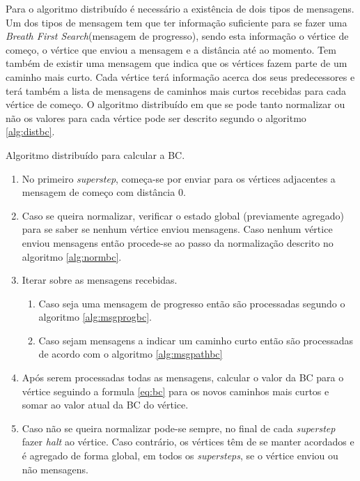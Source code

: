 Para o algoritmo distribuído é necessário a existência de dois tipos de 
mensagens. Um dos tipos de mensagem tem que ter informação suficiente para se 
fazer uma \textit{Breath First Search}(mensagem de progresso), sendo esta 
informação o vértice de começo, o vértice que enviou a mensagem e a distância 
até ao momento. Tem também de existir 
uma mensagem que indica que os vértices fazem parte de um caminho mais curto. 
Cada vértice terá informação acerca dos seus predecessores e terá também a 
lista de mensagens de caminhos mais curtos recebidas para cada vértice de 
começo. O algoritmo distribuído em que se pode tanto normalizar ou não os 
valores para cada vértice pode ser descrito segundo o algoritmo 
\ref{alg:distbc}.

\begin{algorithm}
  \caption{Algoritmo distribuído para calcular a BC.}
  \label{alg:distbc}
  \begin{enumerate}  
    \item No primeiro \textit{superstep}, começa-se por enviar 
  para os vértices adjacentes a mensagem de começo com distância 0.
    \item Caso se queira normalizar, verificar o estado global (previamente 
agregado) para se saber se nenhum vértice enviou mensagens. Caso nenhum vértice 
enviou mensagens então procede-se ao passo da normalização descrito no 
algoritmo \ref{alg:normbc}.
    \item Iterar sobre as mensagens recebidas.
    \begin{enumerate}
      \item Caso seja uma mensagem de progresso então são processadas segundo o 
algoritmo \ref{alg:msgprogbc}.
      \item Caso sejam mensagens a indicar um caminho curto então são 
processadas de acordo com o algoritmo \ref{alg:msgpathbc}
    \end{enumerate}
      \item Após serem processadas todas as mensagens, calcular o valor da 
BC para o vértice seguindo a formula \ref{eq:bc} para os novos caminhos mais 
curtos e somar ao valor atual da BC do vértice.
      \item Caso não se queira normalizar pode-se sempre, no final de cada 
\textit{superstep} fazer \textit{halt} ao vértice. Caso contrário, os vértices 
têm de se manter acordados e é agregado de forma global, em todos os 
\textit{supersteps}, se o vértice enviou ou não mensagens.
  \end{enumerate}
\end{algorithm}

